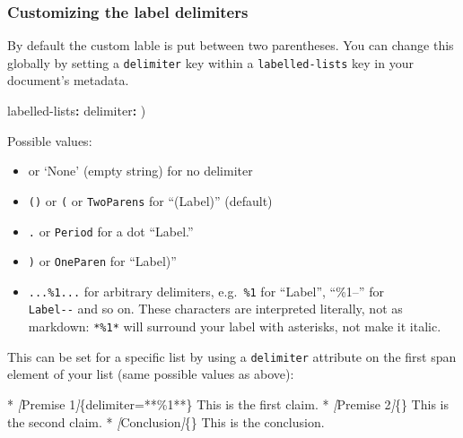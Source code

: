 \documentclass[
]{article}
\newenvironment{Shaded}{}{}
\newcommand{\AttributeTok}[1]{\textcolor[rgb]{0.49,0.56,0.16}{#1}}
\newcommand{\CommentTok}[1]{\textcolor[rgb]{0.38,0.63,0.69}{\textit{#1}}}
\newcommand{\FunctionTok}[1]{\textcolor[rgb]{0.02,0.16,0.49}{#1}}
\newcommand{\KeywordTok}[1]{\textcolor[rgb]{0.00,0.44,0.13}{\textbf{#1}}}
\newcommand{\NormalTok}[1]{#1}
\newcommand{\OtherTok}[1]{\textcolor[rgb]{0.00,0.44,0.13}{#1}}
\newcommand{\SpecialStringTok}[1]{\textcolor[rgb]{0.73,0.40,0.53}{#1}}
\providecommand{\tightlist}{%
  \setlength{\itemsep}{0pt}\setlength{\parskip}{0pt}}
\begin{document}
\hypertarget{customizing-the-label-delimiters}{%
\subsubsection{Customizing the label
delimiters}\label{customizing-the-label-delimiters}}

By default the custom lable is put between two parentheses. You can
change this globally by setting a \texttt{delimiter} key within a
\texttt{labelled-lists} key in your document's metadata.

\begin{Shaded}
\begin{Highlighting}[]
\FunctionTok{labelled{-}lists}\KeywordTok{:}
\AttributeTok{  }\FunctionTok{delimiter}\KeywordTok{:}\AttributeTok{ )}
\end{Highlighting}
\end{Shaded}

Possible values:

\begin{itemize}
\tightlist
\item
  \texttt{\textquotesingle{}\textquotesingle{}} or `None' (empty string)
  for no delimiter
\item
  \texttt{()} or \texttt{(} or \texttt{TwoParens} for ``(Label)''
  (default)
\item
  \texttt{.} or \texttt{Period} for a dot ``Label.''
\item
  \texttt{)} or \texttt{OneParen} for ``Label)''
\item
  \texttt{...\%1...} for arbitrary delimiters,
  e.g.~\texttt{\textbar{}\%1\textbar{}} for
  ``\textbar Label\textbar{}'', ``\%1--'' for\\
  \texttt{Label-\/-} and so on. These characters are interpreted
  literally, not as markdown: \texttt{*\%1*} will surround your label
  with asterisks, not make it italic.
\end{itemize}

This can be set for a specific list by using a \texttt{delimiter}
attribute on the first span element of your list (same possible values
as above):

\begin{Shaded}
\begin{Highlighting}[]
\SpecialStringTok{* }\CommentTok{[}\OtherTok{Premise 1}\CommentTok{]}\NormalTok{\{delimiter=\textquotesingle{}**\%1**\textquotesingle{}\} This is the first claim.}
\SpecialStringTok{* }\CommentTok{[}\OtherTok{Premise 2}\CommentTok{]}\NormalTok{\{\} This is the second claim.}
\SpecialStringTok{* }\CommentTok{[}\OtherTok{Conclusion}\CommentTok{]}\NormalTok{\{\} This is the conclusion.}
\end{Highlighting}
\end{Shaded}
\end{document}
